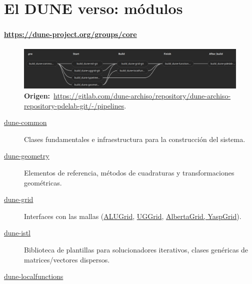 \section{El DUNE verso: módulos}

\begin{frame}[fragile]
	\frametitle{\secname}
	\framesubtitle{\url{https://dune-project.org/groups/core}}

	\begin{figure}[ht!]
		\centering
		\includegraphics[width=14.7cm]{dependences}
		\caption*{
			\textbf{Origen:}~\url{https://gitlab.com/dune-archiso/repository/dune-archiso-repository-pdelab-git/-/pipelines}.
		}
	\end{figure}

	\begin{description}
		\item[\href{https://dune-project.org/modules/dune-common}{dune-common}]

			Clases fundamentales e infraestructura para la
			construcción del sistema.

		\item[\href{https://dune-project.org/modules/dune-geometry}{dune-geometry}]

			Elementos de referencia, métodos de cuadraturas y
			transformaciones geométricas.

		\item[\href{https://dune-project.org/modules/dune-grid}{dune-grid}]

			Interfaces con las mallas
			(\href{https://dune-project.org/modules/dune-alugrid}{ALUGrid},
			\href{https://dune-project.org/modules/dune-uggrid}{UGGrid},
			\href{https://dune-project.org/modules/dune-grid}{AlbertaGrid, YaspGrid}).

		\item[\href{https://dune-project.org/modules/dune-istl}{dune-istl}]

			Biblioteca de plantillas para solucionadores iterativos,
			clases genéricas de matrices/vectores dispersos.

		\item[\href{https://dune-project.org/modules/dune-localfunctions}{dune-localfunctions}]


\end{description}
\end{frame}

